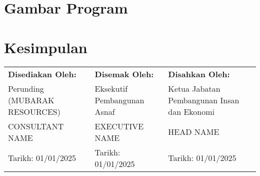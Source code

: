 \documentclass[a4paper,12pt]{article}
\begin{document}
\section{Gambar Program}
\begin{figure}[h]
    \centering
    
\end{figure}

\section{Kesimpulan}


\begin{center}
    \vspace{1cm}
    \begin{tabular}{p{5cm}p{5cm}p{5cm}}
        \textbf{Disediakan Oleh:} & \textbf{Disemak Oleh:} & \textbf{Disahkan Oleh:} \\
        Perunding (MUBARAK RESOURCES) & Eksekutif Pembangunan Asnaf & Ketua Jabatan Pembangunan Insan dan Ekonomi \\
        CONSULTANT NAME & EXECUTIVE NAME & HEAD NAME \\
        Tarikh: 01/01/2025 & Tarikh: 01/01/2025 & Tarikh: 01/01/2025 \\
    \end{tabular}
\end{center}
\end{document}
